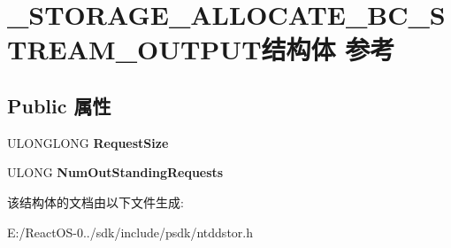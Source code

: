 \hypertarget{struct___s_t_o_r_a_g_e___a_l_l_o_c_a_t_e___b_c___s_t_r_e_a_m___o_u_t_p_u_t}{}\section{\+\_\+\+S\+T\+O\+R\+A\+G\+E\+\_\+\+A\+L\+L\+O\+C\+A\+T\+E\+\_\+\+B\+C\+\_\+\+S\+T\+R\+E\+A\+M\+\_\+\+O\+U\+T\+P\+U\+T结构体 参考}
\label{struct___s_t_o_r_a_g_e___a_l_l_o_c_a_t_e___b_c___s_t_r_e_a_m___o_u_t_p_u_t}
\subsection*{Public 属性}
\begin{DoxyCompactItemize}
\item 
\mbox{\label{struct___s_t_o_r_a_g_e___a_l_l_o_c_a_t_e___b_c___s_t_r_e_a_m___o_u_t_p_u_t_adea7f6b4a78e952c7f913098ee346523}} 
U\+L\+O\+N\+G\+L\+O\+NG {\bfseries Request\+Size}
\item 
\mbox{\label{struct___s_t_o_r_a_g_e___a_l_l_o_c_a_t_e___b_c___s_t_r_e_a_m___o_u_t_p_u_t_ac053a72873a1fb04fc3849c1715f35bf}} 
U\+L\+O\+NG {\bfseries Num\+Out\+Standing\+Requests}
\end{DoxyCompactItemize}


该结构体的文档由以下文件生成\+:\begin{DoxyCompactItemize}
\item 
E\+:/\+React\+O\+S-\/0../sdk/include/psdk/ntddstor.\+h\end{DoxyCompactItemize}
